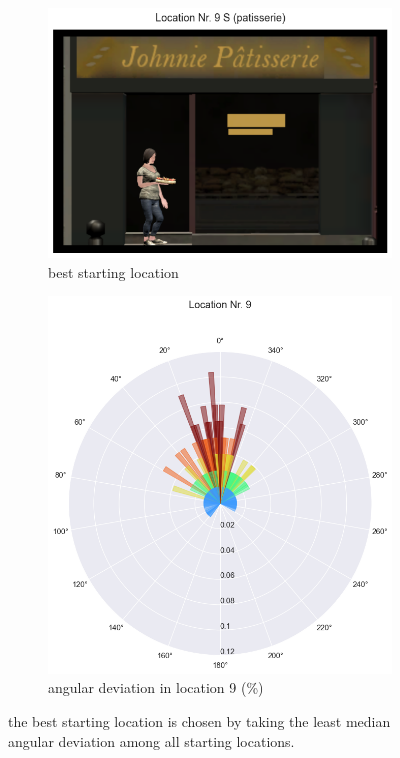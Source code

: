 \begin{figure}[h!]
	\centering
	\begin{subfigure}[b]{0.48\linewidth}
		\includegraphics[width=\linewidth]{figures/best_loc_angular_error_withHA_23.png}
		\caption{best starting location}
		\label{fig:best_angular}
	\end{subfigure}
	\begin{subfigure}[b]{0.48\linewidth}
		\includegraphics[width=\linewidth]{figures/deviation_degrees_loc_nr_9_23.png}
		\caption{angular deviation in location 9 (\%)}
		\label{fig:best_angular_dist_9}
	\end{subfigure}
	
	\caption[Best starting location based on angular deviation]{the best starting location is chosen by taking the least median angular deviation among all starting locations.}
\end{figure}
\label{fig:best_location}


